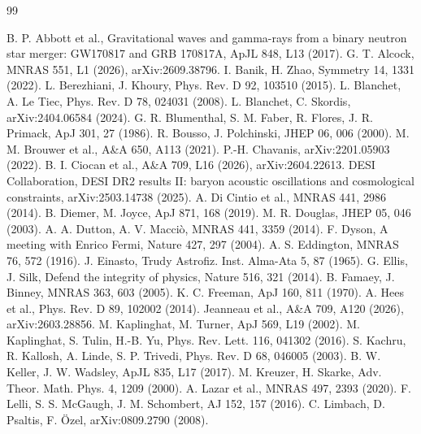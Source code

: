 \begin{thebibliography}{99}\small
{}

 B. P. Abbott et al., Gravitational waves and gamma-rays from a binary neutron star merger: GW170817 and GRB 170817A, ApJL 848, L13 (2017).
 G. T. Alcock, MNRAS 551, L1 (2026), arXiv:2609.38796.
 I. Banik, H. Zhao, Symmetry 14, 1331 (2022).
 L. Berezhiani, J. Khoury, Phys. Rev. D 92, 103510 (2015).
 L. Blanchet, A. Le Tiec, Phys. Rev. D 78, 024031 (2008).
 L. Blanchet, C. Skordis, arXiv:2404.06584 (2024).
 G. R. Blumenthal, S. M. Faber, R. Flores, J. R. Primack, ApJ 301, 27 (1986).
 R. Bousso, J. Polchinski, JHEP 06, 006 (2000).
 M. M. Brouwer et al., A\&A 650, A113 (2021).
 P.-H. Chavanis, arXiv:2201.05903 (2022).
 B. I. Ciocan et al., A\&A 709, L16 (2026), arXiv:2604.22613.
 DESI Collaboration, DESI DR2 results II: baryon acoustic oscillations and cosmological constraints, arXiv:2503.14738 (2025).
 A. Di Cintio et al., MNRAS 441, 2986 (2014).
 B. Diemer, M. Joyce, ApJ 871, 168 (2019).
 M. R. Douglas, JHEP 05, 046 (2003).
 A. A. Dutton, A. V. Macci\`o, MNRAS 441, 3359 (2014).
 F. Dyson, A meeting with Enrico Fermi, Nature 427, 297 (2004).
 A. S. Eddington, MNRAS 76, 572 (1916).
 J. Einasto, Trudy Astrofiz. Inst. Alma-Ata 5, 87 (1965).
 G. Ellis, J. Silk, Defend the integrity of physics, Nature 516, 321 (2014).
 B. Famaey, J. Binney, MNRAS 363, 603 (2005).
 K. C. Freeman, ApJ 160, 811 (1970).
 A. Hees et al., Phys. Rev. D 89, 102002 (2014).
 Jeanneau et al., A\&A 709, A120 (2026), arXiv:2603.28856.
 M. Kaplinghat, M. Turner, ApJ 569, L19 (2002).
 M. Kaplinghat, S. Tulin, H.-B. Yu, Phys. Rev. Lett. 116, 041302 (2016).
 S. Kachru, R. Kallosh, A. Linde, S. P. Trivedi, Phys. Rev. D 68, 046005 (2003).
 B. W. Keller, J. W. Wadsley, ApJL 835, L17 (2017).
 M. Kreuzer, H. Skarke, Adv. Theor. Math. Phys. 4, 1209 (2000).
 A. Lazar et al., MNRAS 497, 2393 (2020).
 F. Lelli, S. S. McGaugh, J. M. Schombert, AJ 152, 157 (2016).
 C. Limbach, D. Psaltis, F. \"Ozel, arXiv:0809.2790 (2008).

\end{thebibliography}
